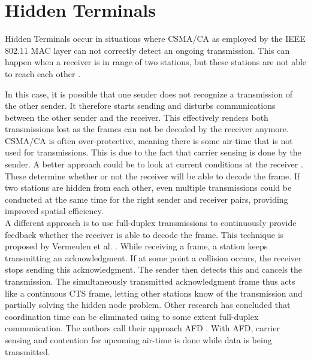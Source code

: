 
\section{Hidden Terminals}

Hidden Terminals occur in situations where \gls{CSMA/CA} as employed by the IEEE 802.11 \gls{MAC} layer can not correctly detect an ongoing transmission. This can happen when a receiver is in range of two stations, but these stations are not able to reach each other \cite{perahia2013}.

In this case, it is possible that one sender does not recognize a transmission of the other sender. It therefore starts sending and disturbs communications between the other sender and the receiver. This effectively renders both transmissions lost as the frames can not be decoded by the receiver anymore.\\

\gls{CSMA/CA} is often over-protective, meaning there is some air-time that is not used for transmissions. This is due to the fact that carrier sensing is done by the sender. A better approach could be to look at current conditions at the receiver \cite{halperin2007}. These determine whether or not the receiver will be able to decode the frame. If two stations are hidden from each other, even multiple transmissions could be conducted at the same time for the right sender and receiver pairs, providing improved spatial efficiency.\\

A different approach is to use full-duplex transmissions to continuously provide feedback whether the receiver is able to decode the frame. This technique is proposed by Vermeulen et al. \cite{vermeulen2016}. While receiving a frame, a station keeps transmitting an acknowledgment. If at some point a collision occurs, the receiver stops sending this acknowledgment. The sender then detects this and cancels the transmission. The simultaneously transmitted acknowledgment frame thus acts like a continuous CTS frame, letting other stations know of the transmission and partially solving the hidden node problem. Other research has concluded that coordination time can be eliminated using to some extent full-duplex communication. The authors call their approach \gls{AFD} \cite{lv2014}. With \gls{AFD}, carrier sensing and contention for upcoming air-time is done while data is being transmitted.

